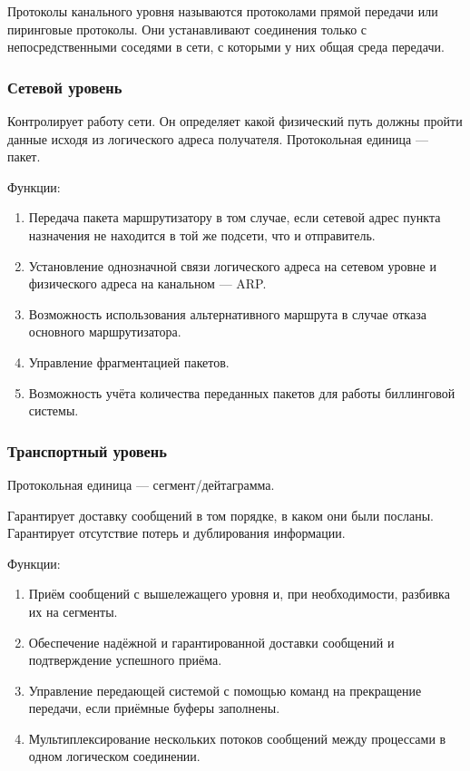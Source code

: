 \documentclass[12pt, russian, oneside, article]{ncc}
\begin{document}
Протоколы канального уровня называются протоколами прямой передачи или пиринговые протоколы. Они устанавливают соединения только с непосредственными соседями в сети, с которыми у них общая среда передачи.
\subsubsection{Сетевой уровень}
\label{sec-1_3_3}


Контролирует работу сети. Он определяет какой физический путь должны пройти данные исходя из логического адреса получателя. Протокольная единица --- пакет.

Функции:
\begin{enumerate}
\item Передача пакета маршрутизатору в том случае, если сетевой адрес пункта назначения не находится в той же подсети, что и отправитель.
\item Установление однозначной связи логического адреса на сетевом уровне и физического адреса на канальном --- ARP.
\item Возможность использования альтернативного маршрута в случае отказа основного маршрутизатора.
\item Управление фрагментацией пакетов.
\item Возможность учёта количества переданных пакетов для работы биллинговой системы.
\end{enumerate}
\subsubsection{Транспортный уровень}
\label{sec-1_3_4}


Протокольная единица --- сегмент/дейтаграмма.

Гарантирует доставку сообщений в том порядке, в каком они были посланы. Гарантирует отсутствие потерь и дублирования информации.

Функции:
\begin{enumerate}
\item Приём сообщений с вышележащего уровня и, при необходимости, разбивка их на сегменты.
\item Обеспечение надёжной и гарантированной доставки сообщений и подтверждение успешного приёма.
\item Управление передающей системой с помощью команд на прекращение передачи, если приёмные буферы заполнены.
\item Мультиплексирование нескольких потоков сообщений между процессами в одном логическом соединении.
\end{enumerate}
\end{document}
